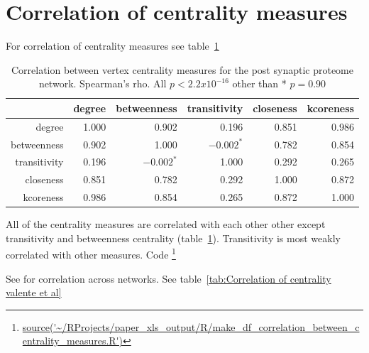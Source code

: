  

\section{Correlation of centrality measures}

For correlation of centrality measures see table~\ref{tab:Correlation between vertex centrality measures for PSP. Spearman's rho}


\begin{table}[ht]
\centering
\begin{tabular}{rrrrrr}
  \hline
 & degree & betweenness & transitivity & closeness & kcoreness \\ 
  \hline
degree & 1.000 & 0.902 & 0.196 & 0.851 & 0.986 \\ 
  betweenness & 0.902 & 1.000 & $-0.002^*$ & 0.782 & 0.854 \\ 
  transitivity & 0.196 & $-0.002^*$ & 1.000 & 0.292 & 0.265 \\ 
  closeness & 0.851 & 0.782 & 0.292 & 1.000 & 0.872 \\  
 

  kcoreness & 0.986 & 0.854 & 0.265 & 0.872 & 1.000 \\ 
   \hline
\end{tabular}
\caption{Correlation between vertex centrality measures for the post synaptic proteome network. Spearman's rho. All $p < 2.2 x 10^{-16}$ other than * $p=0.90$} 
\label{tab:Correlation between vertex centrality measures for PSP. Spearman's rho}
\end{table}




All of the centrality measures are correlated with each other other except transitivity and betweenness centrality  (table~\ref{tab:Correlation between vertex centrality measures for PSP. Spearman's rho}). Transitivity is most weakly correlated with other measures. Code \footnote{\url{source('~/RProjects/paper_xls_output/R/make_df_correlation_between_centrality_measures.R')}}



See \cite{oldham2019consistency} for correlation across networks. See table~\ref{tab:Correlation of centrality valente et al}

